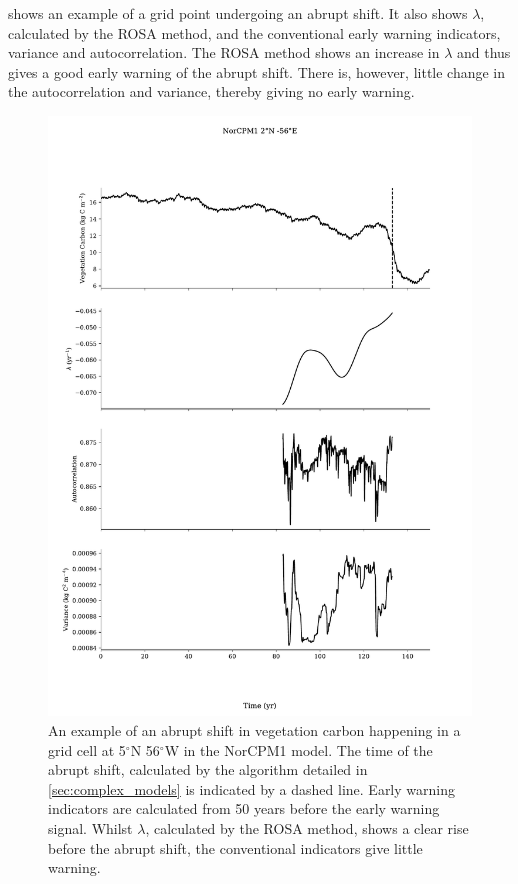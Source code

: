  shows an example of a grid point undergoing an abrupt shift. It also shows $\lambda$, calculated by the ROSA method, and the conventional early warning
indicators, variance and autocorrelation. The ROSA method shows an increase in $\lambda$ and thus gives a good early warning of the abrupt shift.
There is, however, little change in the autocorrelation and variance, thereby giving no early warning.

\begin{figure}
  \centering
  \includegraphics[scale=0.5,keepaspectratio]{nor_esm_point}
  \caption[An abrupt shift from NorCPM1]{An example of an abrupt shift in vegetation carbon happening in a grid cell at 5$^\circ$N 56$^\circ$W in the NorCPM1 model.
    The time of the abrupt shift, calculated by the algorithm detailed in \cref{sec:complex_models} is indicated by a dashed line.
    Early warning indicators are calculated from 50 years before the early warning signal. Whilst $\lambda$, calculated by the ROSA method, shows a clear rise before the abrupt shift,
    the conventional indicators give little warning.}
  \label{fig:norcpm1}
\end{figure}

